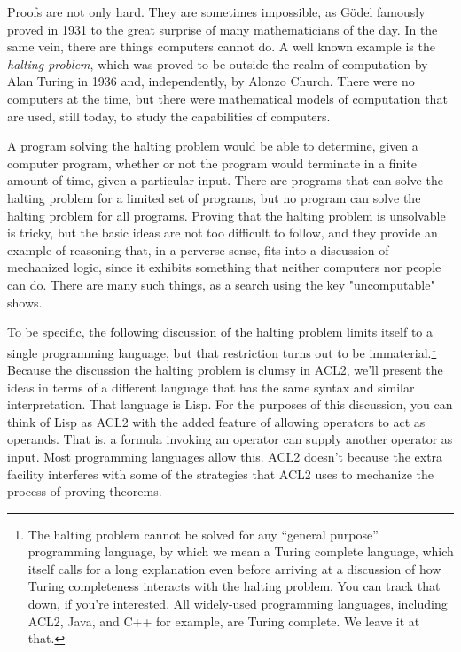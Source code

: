 Proofs are not only hard.
They are sometimes impossible, as G\"odel famously proved in 1931
to the great surprise of many mathematicians of the day.
In the same vein, there are things computers cannot do.
A well known example is the \emph{halting problem}, which
was proved to be outside the realm of computation
by Alan Turing in 1936
and, independently, by Alonzo Church.
There were no computers at the time,
but there were mathematical models of computation
that are used, still today, to study the capabilities of computers.

A program solving the
halting problem would be able to determine,
given a computer program, whether or not the program would terminate
in a finite amount of time, given a particular input.
There are programs that can solve the halting problem for
a limited set of programs,
but no program can solve the halting problem for all programs.
Proving that the halting problem is unsolvable is tricky,
but the basic ideas are not too difficult to follow, and
they provide an example of reasoning that,
in a perverse sense, fits into a discussion of mechanized logic,
since it exhibits something that neither computers
nor people can do. There are many such things, as a search
using the key "uncomputable" shows.

To be specific, the following discussion of the halting problem
limits itself to a single programming language, but
that restriction turns out to be immaterial.\footnote{The
halting problem cannot be solved
for any ``general purpose'' programming language,
by which we mean a Turing complete language,
which itself calls for a long explanation even
before arriving at a discussion of how Turing completeness
interacts with the halting problem.
You can track that down, if you're interested.
All widely-used programming languages,
including ACL2, Java, and C++ for example, are Turing complete.
We leave it at that.}
Because the discussion the halting problem is clumsy in ACL2,
we'll present the ideas in terms of a different
language that has the same syntax
and similar interpretation. That language is Lisp.
For the purposes of this discussion,
you can think of Lisp as ACL2 with the added feature
of allowing operators to act as operands.
That is, a formula invoking an operator can supply
another operator as input.
Most programming languages allow this.
ACL2 doesn't because the extra facility
interferes with some of the strategies that ACL2 uses
to mechanize the process of proving theorems.

